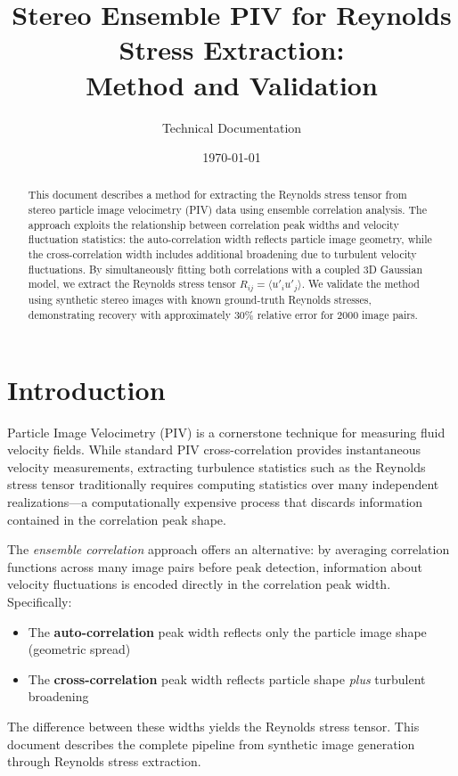 \documentclass[11pt,a4paper]{article}
\title{Stereo Ensemble PIV for Reynolds Stress Extraction:\\Method and Validation}
\author{Technical Documentation}
\date{\today}
\begin{document}
\maketitle

\begin{abstract}
This document describes a method for extracting the Reynolds stress tensor from stereo particle image velocimetry (PIV) data using ensemble correlation analysis. The approach exploits the relationship between correlation peak widths and velocity fluctuation statistics: the auto-correlation width reflects particle image geometry, while the cross-correlation width includes additional broadening due to turbulent velocity fluctuations. By simultaneously fitting both correlations with a coupled 3D Gaussian model, we extract the Reynolds stress tensor $R_{ij} = \langle u'_i u'_j \rangle$. We validate the method using synthetic stereo images with known ground-truth Reynolds stresses, demonstrating recovery with approximately 30\% relative error for 2000 image pairs.
\end{abstract}

\section{Introduction}

Particle Image Velocimetry (PIV) is a cornerstone technique for measuring fluid velocity fields. While standard PIV cross-correlation provides instantaneous velocity measurements, extracting turbulence statistics such as the Reynolds stress tensor traditionally requires computing statistics over many independent realizations---a computationally expensive process that discards information contained in the correlation peak shape.

The \textit{ensemble correlation} approach offers an alternative: by averaging correlation functions across many image pairs before peak detection, information about velocity fluctuations is encoded directly in the correlation peak width. Specifically:
\begin{itemize}
    \item The \textbf{auto-correlation} peak width reflects only the particle image shape (geometric spread)
    \item The \textbf{cross-correlation} peak width reflects particle shape \textit{plus} turbulent broadening
\end{itemize}

The difference between these widths yields the Reynolds stress tensor. This document describes the complete pipeline from synthetic image generation through Reynolds stress extraction.
\end{document}
